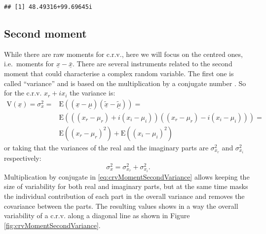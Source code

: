 \documentclass[
]{book}
\begin{document}
\begin{verbatim}
## [1] 48.49316+99.69645i
\end{verbatim}

\hypertarget{crvSecondMoment}{%
\subsection{Second moment}\label{crvSecondMoment}}

While there are raw moments for c.r.v., here we will focus on the centred ones, i.e.~moments for \(\underline{x}-\bar{\underline{x}}\). There are several instruments related to the second moment that could characterise a complex random variable. The first one is called ``variance'' and is based on the multiplication by a conjugate number \citep{reference}. So for the c.r.v. \(x_r + i x_i\) the variance is:
\begin{equation}
    \begin{aligned}
    \mathrm{V}(\underline{x}) = \sigma_x^2 = & \mathrm{E}((\underline{x}-\underline{\mu}) (\tilde{\underline{x}}-\tilde{\underline{\mu}})) = \\
                 & \mathrm{E}\left(((x_r-\mu_{r}) + i (x_i-\mu_{i}))((x_r-\mu_{r}) - i (x_i-\mu_{i}))\right) = \\
                 & \mathrm{E}((x_r-\mu_{r})^2) +  \mathrm{E}((x_i-\mu_{i})^2)
    \end{aligned}
    \label{eq:crvMomentSecondVariance}
\end{equation}
or taking that the variances of the real and the imaginary parts are \(\sigma_{x_r}^2\) and \(\sigma_{x_i}^2\) respectively:
\begin{equation}
    \sigma_x^2 = \sigma_{x_r}^2 + \sigma_{x_i}^2.
    \label{eq:crvMomentSecondVarianceShort}
\end{equation}
Multiplication by conjugate in \eqref{eq:crvMomentSecondVariance} allows keeping the size of variability for both real and imaginary parts, but at the same time masks the individual contribution of each part in the overall variance and removes the covariance between the parts. The resulting values shows in a way the overall variability of a c.r.v. along a diagonal line as shown in Figure \ref{fig:crvMomentSecondVariance}.
\end{document}
